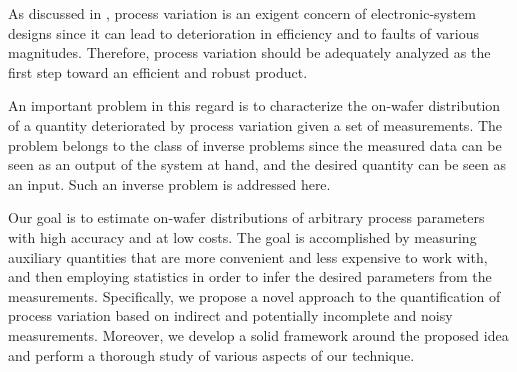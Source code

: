 As discussed in , process variation is an exigent
concern of electronic-system designs since it can lead to deterioration in
efficiency and to faults of various magnitudes. Therefore, process variation
should be adequately analyzed as the first step toward an efficient and robust
product.

An important problem in this regard is to characterize the on-wafer distribution
of a quantity deteriorated by process variation given a set of measurements. The
problem belongs to the class of inverse problems since the measured data can be
seen as an output of the system at hand, and the desired quantity can be seen as
an input. Such an inverse problem is addressed here.

Our goal is to estimate on-wafer distributions of arbitrary process parameters
with high accuracy and at low costs. The goal is accomplished by measuring
auxiliary quantities that are more convenient and less expensive to work with,
and then employing statistics in order to infer the desired parameters from the
measurements. Specifically, we propose a novel approach to the quantification of
process variation based on indirect and potentially incomplete and noisy
measurements. Moreover, we develop a solid framework around the proposed idea
and perform a thorough study of various aspects of our technique.
